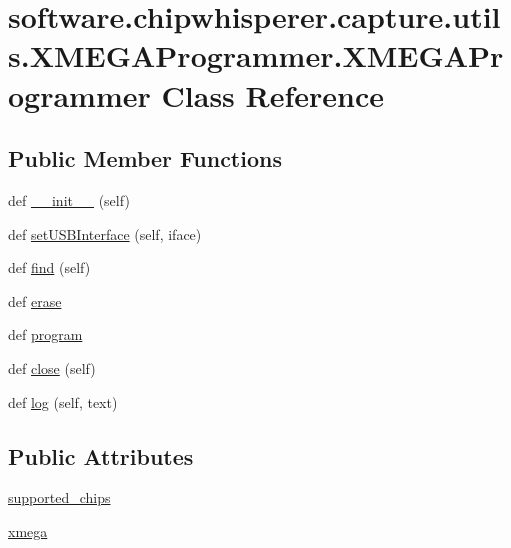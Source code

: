 \hypertarget{classsoftware_1_1chipwhisperer_1_1capture_1_1utils_1_1XMEGAProgrammer_1_1XMEGAProgrammer}{}\section{software.\+chipwhisperer.\+capture.\+utils.\+X\+M\+E\+G\+A\+Programmer.\+X\+M\+E\+G\+A\+Programmer Class Reference}
\label{classsoftware_1_1chipwhisperer_1_1capture_1_1utils_1_1XMEGAProgrammer_1_1XMEGAProgrammer}
\subsection*{Public Member Functions}
\begin{DoxyCompactItemize}
\item 
def \hyperlink{classsoftware_1_1chipwhisperer_1_1capture_1_1utils_1_1XMEGAProgrammer_1_1XMEGAProgrammer_ac812d367845670b7b5d1b9b116cf374a}{\+\_\+\+\_\+init\+\_\+\+\_\+} (self)
\item 
def \hyperlink{classsoftware_1_1chipwhisperer_1_1capture_1_1utils_1_1XMEGAProgrammer_1_1XMEGAProgrammer_ad34b31ceebb08f219ac07dad99eb7c71}{set\+U\+S\+B\+Interface} (self, iface)
\item 
def \hyperlink{classsoftware_1_1chipwhisperer_1_1capture_1_1utils_1_1XMEGAProgrammer_1_1XMEGAProgrammer_a1ed027be1f7a8eb827992baaccff22c8}{find} (self)
\item 
def \hyperlink{classsoftware_1_1chipwhisperer_1_1capture_1_1utils_1_1XMEGAProgrammer_1_1XMEGAProgrammer_a436ce9e51ad7387dc526d49207a08926}{erase}
\item 
def \hyperlink{classsoftware_1_1chipwhisperer_1_1capture_1_1utils_1_1XMEGAProgrammer_1_1XMEGAProgrammer_ad0b37d9d8634c073ef0015c3112be465}{program}
\item 
def \hyperlink{classsoftware_1_1chipwhisperer_1_1capture_1_1utils_1_1XMEGAProgrammer_1_1XMEGAProgrammer_a4257480a30bb0f238c4ad26a2751b4d2}{close} (self)
\item 
def \hyperlink{classsoftware_1_1chipwhisperer_1_1capture_1_1utils_1_1XMEGAProgrammer_1_1XMEGAProgrammer_a2e0121e58bd9247d7b3146183e60d661}{log} (self, text)
\end{DoxyCompactItemize}
\subsection*{Public Attributes}
\begin{DoxyCompactItemize}
\item 
\hyperlink{classsoftware_1_1chipwhisperer_1_1capture_1_1utils_1_1XMEGAProgrammer_1_1XMEGAProgrammer_a610d9b89854c02765d662473d30b9f30}{supported\+\_\+chips}
\item 
\hyperlink{classsoftware_1_1chipwhisperer_1_1capture_1_1utils_1_1XMEGAProgrammer_1_1XMEGAProgrammer_a0c2c0d2521983b93c89989b13e3add4e}{xmega}
\end{DoxyCompactItemize}


